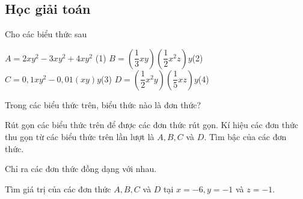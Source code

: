 \subsection{Học giải toán}
\begin{vd}%
	Cho các biểu thức sau
	\begin{center}
		$A=2xy^2-3xy^2+4xy^2$ \quad(1) \hspace*{3cm}
		$B=\left(\dfrac{1}{3}xy\right)\left(\dfrac{1}{2}x^2z\right)y$\quad(2)\\
		$C=0{,}1xy^2-0{,}01(xy)y$\quad(3) \hspace*{3cm}
		$D=\left(\dfrac{1}{2}x^2y\right)\left(\dfrac{1}{5}xz\right)y$\quad(4)
	\end{center}
	
	\begin{enumEX}{1}
		\item Trong các biểu thức trên, biểu thức nào là đơn thức?
		\item Rút gọn các biểu thức trên để được các đơn thức rút gọn. Kí hiệu các đơn thức thu gọn từ các biểu thức trên lần lượt là $A,B,C$ và $D$. Tìm bậc của các đơn thức.
		\item Chỉ ra các đơn thức đồng dạng với nhau.
		\item Tìm giá trị của các đơn thức $A,B,C$ và $D$ tại $x=-6,y=-1$ và $z=-1$.
	\end{enumEX}
\end{vd}

